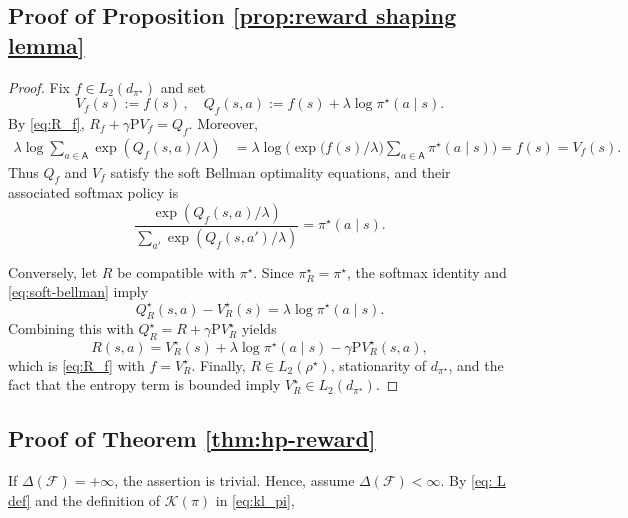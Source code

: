 \documentclass{article}
\theoremstyle{definition}
\theoremstyle{remark}
\theoremstyle{plain}
\newcommand{\MKQ}{\mathrm{P}}
\def\eqsp{\,}
\numberwithin{equation}{section}
\begin{document}
\subsection{Proof of Proposition \ref{prop:reward shaping lemma}}
\label{app:compatible}
\begin{proof}
Fix 
\(
f\in L_2(d_{\pi^\star})\) 
and set
\[
    V_f(s):=f(s)\eqsp, \quad 
Q_f(s,a):=f(s)+\lambda\log\pi^\star(a\mid s).
\]
By \eqref{eq:R_f},
\(
    R_f+\gamma\MKQ V_f
    =
    Q_f.
\)
Moreover,
\[
\begin{aligned}
    \lambda\log\sum_{a\in\mathsf A}
    \exp\!\left({Q_f(s,a)}/{\lambda}\right)
    &=
    \lambda\log\Big(
        \exp\big({f(s)/\lambda}\big)
        \sum_{a\in\mathsf A}\pi^\star(a\mid s)
    \Big)
    =f(s)=V_f(s).
\end{aligned}
\]
Thus \(Q_f\) and \(V_f\) satisfy the soft Bellman optimality equations,
and their associated softmax policy is
\[
    \frac{\exp(Q_f(s,a)/\lambda)}
    {\sum_{a'}\exp(Q_f(s,a')/\lambda)}
    =
    \pi^\star(a\mid s).
\]

Conversely, let \(R\) be compatible with \(\pi^\star\). Since
\(\pi_R^\star=\pi^\star\), the softmax identity and
\eqref{eq:soft-bellman} imply
\[
    Q_R^\star(s,a)-V_R^\star(s)
    =
    \lambda\log\pi^\star(a\mid s).
\]
Combining this with
\(Q_R^\star=R+\gamma\MKQ V_R^\star\) yields
\[
    R(s,a)
    =
    V_R^\star(s)
    +
    \lambda\log\pi^\star(a\mid s)
    -
    \gamma\MKQ V_R^\star(s,a),
\]
which is \eqref{eq:R_f} with \(f=V_R^\star\).
Finally, \(R\in L_2(\rho^\star)\), stationarity of
\(d_{\pi^\star}\), and the fact that the entropy term is bounded imply
\(V_R^\star\in L_2(d_{\pi^\star})\).
\end{proof}

\subsection{Proof of Theorem \ref{thm:hp-reward}}
\label{subsec:policy-oracle-proof}
If \(\Delta(\mathcal F)=+\infty\), the assertion is trivial. Hence,
assume \(\Delta(\mathcal F)<\infty\). By \eqref{eq: L def} and the definition of  \(
    \mathcal K(\pi)\)
in \eqref{eq:kl_pi}, 
\end{document}
